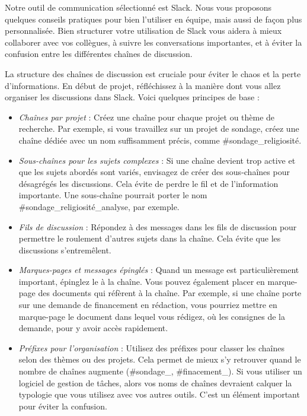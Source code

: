 \documentclass[
  letterpaper,
  DIV=11,
  numbers=noendperiod]{scrreprt}
\begin{document}
Notre outil de communication sélectionné est Slack. Nous vous proposons
quelques conseils pratiques pour bien l'utiliser en équipe, mais aussi
de façon plus personnalisée. Bien structurer votre utilisation de Slack
vous aidera à mieux collaborer avec vos collègues, à suivre les
conversations importantes, et à éviter la confusion entre les
différentes chaînes de discussion.

La structure des chaînes de discussion est cruciale pour éviter le chaos
et la perte d'informations. En début de projet, réfléchissez à la
manière dont vous allez organiser les discussions dans Slack. Voici
quelques principes de base :

\begin{itemize}
\item
  \emph{Chaînes par projet} : Créez une chaîne pour chaque projet ou
  thème de recherche. Par exemple, si vous travaillez sur un projet de
  sondage, créez une chaîne dédiée avec un nom suffisamment précis,
  comme \#sondage\_religiosité.
\item
  \emph{Sous-chaînes pour les sujets complexes} : Si une chaîne devient
  trop active et que les sujets abordés sont variés, envisagez de créer
  des sous-chaînes pour désagrégés les discussions. Cela évite de perdre
  le fil et de l'information importante. Une sous-chaîne pourrait porter
  le nom \#sondage\_religiosité\_analyse, par exemple.
\item
  \emph{Fils de discussion} : Répondez à des messages dans les fils de
  discussion pour permettre le roulement d'autres sujets dans la chaîne.
  Cela évite que les discussions s'entremêlent.
\item
  \emph{Marques-pages et messages épinglés} : Quand un message est
  particulièrement important, épinglez le à la chaîne. Vous pouvez
  également placer en marque-page des documents qui réfèrent à la
  chaîne. Par exemple, si une chaîne porte sur une demande de
  financement en rédaction, vous pourriez mettre en marque-page le
  document dans lequel vous rédigez, où les consignes de la demande,
  pour y avoir accès rapidement.
\item
  \emph{Préfixes pour l'organisation} : Utilisez des préfixes pour
  classer les chaînes selon des thèmes ou des projets. Cela permet de
  mieux s'y retrouver quand le nombre de chaînes augmente (\#sondage\_,
  \#finacement\_). Si vous utiliser un logiciel de gestion de tâches,
  alors vos noms de chaînes devraient calquer la typologie que vous
  utilisez avec vos autres outils. C'est un élément important pour
  éviter la confusion.
\end{itemize}
\end{document}

